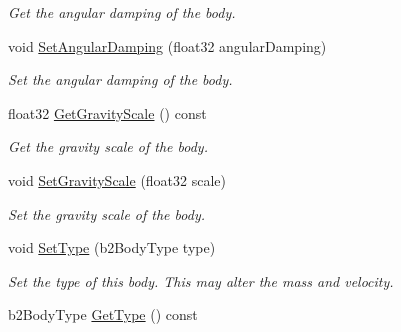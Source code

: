 \begin{DoxyCompactItemize}
\begin{DoxyCompactList}\small\item\em Get the angular damping of the body. \end{DoxyCompactList}\item 
\hypertarget{classb2_body_a73a79541b18394fa224d2eae8ad493e8}{void \hyperlink{classb2_body_a73a79541b18394fa224d2eae8ad493e8}{Set\-Angular\-Damping} (float32 angular\-Damping)}\label{classb2_body_a73a79541b18394fa224d2eae8ad493e8}

\begin{DoxyCompactList}\small\item\em Set the angular damping of the body. \end{DoxyCompactList}\item 
\hypertarget{classb2_body_ad8348f06a391d169d6395dfd66762454}{float32 \hyperlink{classb2_body_ad8348f06a391d169d6395dfd66762454}{Get\-Gravity\-Scale} () const }\label{classb2_body_ad8348f06a391d169d6395dfd66762454}

\begin{DoxyCompactList}\small\item\em Get the gravity scale of the body. \end{DoxyCompactList}\item 
\hypertarget{classb2_body_a8e66a570c2aeee93b29d84cae861a612}{void \hyperlink{classb2_body_a8e66a570c2aeee93b29d84cae861a612}{Set\-Gravity\-Scale} (float32 scale)}\label{classb2_body_a8e66a570c2aeee93b29d84cae861a612}

\begin{DoxyCompactList}\small\item\em Set the gravity scale of the body. \end{DoxyCompactList}\item 
\hypertarget{classb2_body_a34ff1c84b10b74eb990749a025a1b1ad}{void \hyperlink{classb2_body_a34ff1c84b10b74eb990749a025a1b1ad}{Set\-Type} (b2\-Body\-Type type)}\label{classb2_body_a34ff1c84b10b74eb990749a025a1b1ad}

\begin{DoxyCompactList}\small\item\em Set the type of this body. This may alter the mass and velocity. \end{DoxyCompactList}\item 
\hypertarget{classb2_body_aa0d5acad4f0104e709e34e29a4a0c1a4}{b2\-Body\-Type \hyperlink{classb2_body_aa0d5acad4f0104e709e34e29a4a0c1a4}{Get\-Type} () const }\label{classb2_body_aa0d5acad4f0104e709e34e29a4a0c1a4}


\end{DoxyCompactItemize}
